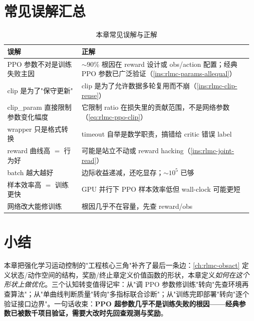 \section*{常见误解汇总}
\label{sec:rlmc-train-misconceptions}

\begin{table}[H]
\centering
\caption{本章常见误解与正解}
\label{tab:rlmc-train-misc}
\begin{tabular}{p{6.0cm}p{7.0cm}}
\hline
误解 & 正解 \\
\hline
PPO 参数不对是训练失败主因 & $\sim90\%$ 根因在 reward 设计或 obs/action 配置；经典 PPO 参数已广泛验证（\cref{ins:rlmc-params-allequal}） \\
clip 是为了"保守更新" & clip 是为了允许数据多轮复用而不崩（\cref{ins:rlmc-clip-reuse}） \\
clip\_param 直接限制参数变化幅度 & 它限制 ratio 在损失里的贡献范围，不是网络参数（\cref{eq:rlmc-ppo-clip}） \\
wrapper 只是格式转换 & timeout 自举是数学职责，搞错给 critic 错误 label \\
reward 曲线高 $=$ 行为好 & 可能是站立不动或 reward hacking（\cref{ins:rlmc-joint-read}） \\
batch 越大越好 & 边际收益递减，还吃显存；$\sim10^5$ 已够 \\
样本效率高 $=$ 训练更快 & GPU 并行下 PPO 样本效率低但 wall-clock 可能更短 \\
网络改大能修训练 & 根因几乎不在容量，先查 reward/obs \\
\hline
\end{tabular}
\end{table}

\section*{小结}
\label{sec:rlmc-train-summary}

本章把强化学习运动控制的"工程核心三角"补齐了最后一条边：\cref{ch:rlmc-obsact} 定义状态/动作空间的结构，奖励/终止章定义价值函数的形状，本章定义\emph{如何在这个形状上做优化}。三个认知转变值得记牢：从"调 PPO 参数修训练"转向"先查环境再查算法"；从"单曲线判断质量"转向"多指标联合诊断"；从"训练完即部署"转向"逐个验证接口边界"。一句话收束：\textbf{PPO 超参数几乎不是训练失败的根因——经典参数已被数千项目验证，需要大改时先回查观测与奖励}。

